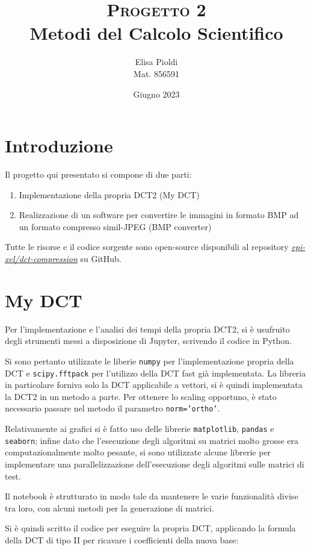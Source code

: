\documentclass[12pt]{article}
\title{\textbf{\textsc{Progetto 2}}\\Metodi del Calcolo Scientifico}
\author{Elisa Pioldi\\
        Mat. 856591}
\date{Giugno 2023}
\begin{document}
\maketitle

\section{Introduzione}

Il progetto qui presentato si compone di due parti:
\begin{enumerate}
    \item Implementazione della propria DCT2 (My DCT)
    \item Realizzazione di un software per convertire le immagini in formato BMP ad un formato compresso simil-JPEG (BMP converter)
\end{enumerate}

Tutte le risorse e il codice sorgente sono open-source disponibili al repository
\href{https://github.com/epi-xel/dct-compression}{\textit{epi-xel/dct-compression}}
su GitHub.

\section{My DCT}

Per l'implementazione e l'analisi dei tempi della propria DCT2, si è usufruito degli strumenti messi a disposizione di Jupyter, scrivendo il codice in Python.

Si sono pertanto utilizzate le liberie \texttt{numpy} per l'implementazione propria della DCT e \texttt{scipy.fftpack} per l'utilizzo della DCT fast già implementata. La libreria in particolare forniva solo la DCT applicabile a vettori, si è quindi implementata la DCT2 in un metodo a parte. Per ottenere lo scaling opportuno, è stato necessario passare nel metodo il parametro \texttt{norm='ortho'}.

Relativamente ai grafici si è fatto uso delle librerie \texttt{matplotlib}, \texttt{pandas} e \texttt{seaborn}; infine dato che l'esecuzione degli algoritmi su matrici molto grosse era computazionalmente molto pesante, si sono utilizzate alcune librerie per implementare una parallelizzazione dell'esecuzione degli algoritmi sulle matrici di test.

Il notebook è strutturato in modo tale da mantenere le varie funzionalità divise tra loro, con alcuni metodi per la generazione di matrici.

Si è quindi scritto il codice per eseguire la propria DCT, applicando la formula della DCT di tipo II per ricavare i coefficienti della nuova base:
\end{document}
